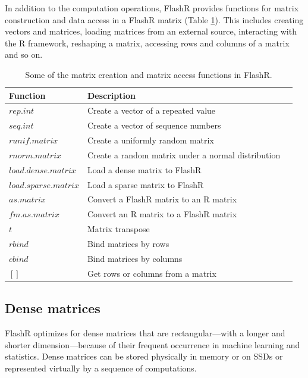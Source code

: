 In addition to the computation operations, FlashR provides functions for matrix
construction and data access in a FlashR matrix (Table \ref{tbl:utility}). This
includes creating vectors and matrices, loading matrices from an external source,
interacting with the R framework, reshaping a matrix, accessing rows and columns of
a matrix and so on.


\begin{table}
\begin{center}
\footnotesize
\begin{tabular}{|l|l|l|}
\hline
Function & Description \\
\hline
$rep.int$ & Create a vector of a repeated value \\
$seq.int$ & Create a vector of sequence numbers \\
$runif.matrix$ & Create a uniformly random matrix  \\
$rnorm.matrix$ & Create a random matrix under a normal distribution \\
\hline
$load.dense.matrix$ & Load a dense matrix to FlashR \\
$load.sparse.matrix$ & Load a sparse matrix to FlashR \\
\hline
$as.matrix$ & Convert a FlashR matrix to an R matrix \\
$fm.as.matrix$ & Convert an R matrix to a FlashR matrix \\
\hline
$t$ & Matrix transpose \\
$rbind$ & Bind matrices by rows \\
$cbind$ & Bind matrices by columns \\
$[]$ & Get rows or columns from a matrix \\
\hline
\end{tabular}
\normalsize
\end{center}
\caption{Some of the matrix creation and matrix access functions in FlashR.}
\label{tbl:utility}
\end{table}

\subsection{Dense matrices}
FlashR optimizes for dense matrices that are rectangular---with
a longer and shorter dimension---because of their frequent occurrence
in machine learning and statistics. Dense matrices can be stored
physically in memory or on SSDs or represented virtually by a sequence of
computations.

